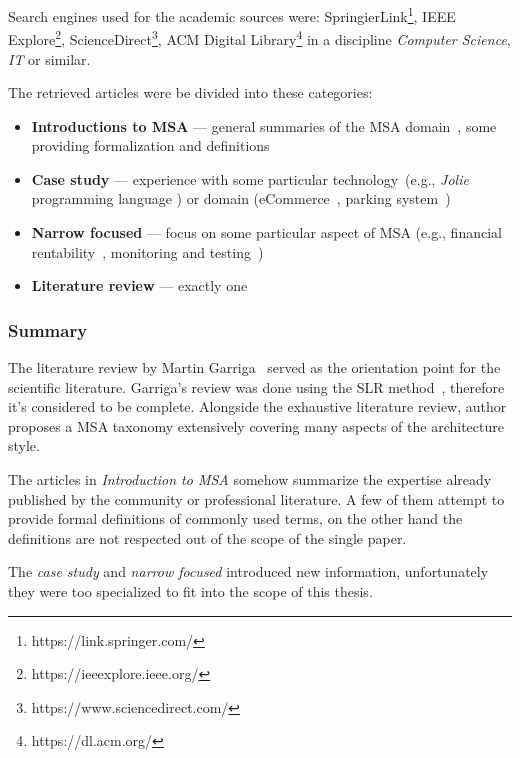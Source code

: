 \documentclass[thesis=M,english,hidelinks]{FITthesis}[2012/10/20]
\begin{document}
Search engines used for the academic sources were: SpringierLink\footnote{https://link.springer.com/}, IEEE Explore\footnote{https://ieeexplore.ieee.org/},  ScienceDirect\footnote{https://www.sciencedirect.com/}, ACM Digital Library\footnote{https://dl.acm.org/} in a discipline \textit{Computer Science}, \textit{IT} or similar.

The retrieved articles were be divided into these categories:
\begin{itemize}
    \item \textbf{Introductions to MSA} --- general summaries of the \acrshort{MSA} domain~\cite{ms-sc-collaborative-mdd, ms-sc-Schwartz2017, ms-sc-Gruhn2018}, some providing formalization and definitions~\cite{ms-today-tomorrow}
    \item \textbf{Case study} --- experience with some particular technology~(e.g., \textit{Jolie} programming language \cite{ms-sc-Guidi2017}) or domain (eCommerce~\cite{ms-sc-ecommerce}, parking system~\cite{ms-sc-parking})
    \item \textbf{Narrow focused} --- focus on some particular aspect of \acrshort{MSA} (e.g., financial rentability~\cite{ms-sc-economics}, monitoring and testing~\cite{ms-sc-visualization})
    \item \textbf{Literature review} --- exactly one~\cite{ms-taxonomy}
\end{itemize}

\subsubsection*{Summary}
The literature review by Martin Garriga~\cite{ms-taxonomy} served as the orientation point for the scientific literature. Garriga's review was done using the \acrfull{SLR} method~\cite{slr-guidelines}, therefore it's considered to be complete. Alongside the exhaustive literature review, author proposes a \acrshort{MSA} taxonomy extensively covering many aspects of the architecture style.

The articles in \textit{Introduction to \acrshort{MSA}} somehow summarize the expertise already published by the community or professional literature. A few of them attempt to provide formal definitions of commonly used terms, on the other hand the definitions are not respected out of the scope of the single paper.

The \textit{case study} and \textit{narrow focused} introduced new information, unfortunately they were too specialized to fit into the scope of this thesis.
\end{document}
